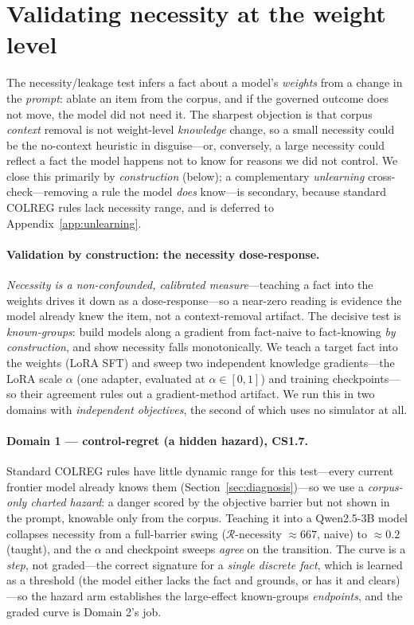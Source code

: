\documentclass{article}
\newcommand{\regret}{\mathcal{R}}
\begin{document}
\section{Validating necessity at the weight level}
\label{sec:weightlevel}\label{sec:construction}
The necessity/leakage test infers a fact about a model's \emph{weights} from a change in the
\emph{prompt}: ablate an item from the corpus, and if the governed outcome does not move, the
model did not need it. The sharpest objection is that corpus \emph{context} removal is not
weight-level \emph{knowledge} change, so a small necessity could be the no-context heuristic in
disguise---or, conversely, a large necessity could reflect a fact the model happens not to know
for reasons we did not control. We close this primarily by \emph{construction} (below); a complementary
\emph{unlearning} cross-check---removing a rule the model \emph{does} know---is secondary, because
standard COLREG rules lack necessity range, and is deferred to Appendix~\ref{app:unlearning}.

\paragraph{Validation by construction: the necessity dose-response.}
\emph{Necessity is a non-confounded, calibrated measure}---teaching
a fact into the weights drives it down as a dose-response---so a near-zero reading is evidence the model
already knew the item, not a context-removal artifact. The decisive test is \emph{known-groups}: build
models along a gradient from fact-naive to
fact-knowing \emph{by construction}, and show necessity falls monotonically. We teach a target
fact into the weights (LoRA SFT) and sweep two independent knowledge gradients---the LoRA scale
$\alpha$ (one adapter, evaluated at $\alpha\in[0,1]$) and training checkpoints---so their
agreement rules out a gradient-method artifact. We run this in two domains with \emph{independent
objectives}, the second of which uses no simulator at all.

\paragraph{Domain 1 --- control-regret (a hidden hazard), CS1.7.} Standard COLREG rules have little dynamic
range for this test---every current frontier model already knows them (Section~\ref{sec:diagnosis})---so we
use a \emph{corpus-only charted hazard}: a danger scored by the objective barrier but not shown in
the prompt, knowable only from the corpus. Teaching it into a Qwen2.5-3B model collapses necessity
from a full-barrier swing ($\regret$-necessity $\approx 667$, naive) to $\approx 0.2$ (taught), and
the $\alpha$ and checkpoint sweeps \emph{agree} on the transition. The curve is a \emph{step}, not
graded---the correct signature for a \emph{single discrete fact}, which is learned as a threshold
(the model either lacks the fact and grounds, or has it and clears)---so the hazard arm establishes
the large-effect known-groups \emph{endpoints}, and the graded curve is Domain 2's job.
\end{document}
